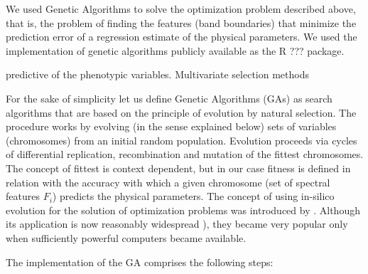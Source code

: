 {We used Genetic Algorithms to solve the optimization problem described
above, that is, the problem of finding the features (band boundaries)
that minimize the prediction error of a regression estimate of the
physical parameters. We used the implementation of genetic algorithms
publicly available as the R \citep{R2013} ???  package.

predictive of the phenotypic variables. Multivariate selection methods

For the sake of simplicity let us define Genetic Algorithms (GAs) as
search algorithms that are based on the principle of evolution by
natural selection. The procedure works by evolving (in the sense
explained below) sets of variables (chromosomes) from an initial
random population. Evolution proceeds via cycles of differential
replication, recombination and mutation of the fittest
chromosomes. The concept of fittest is context dependent, but in our
case fitness is defined in relation with the accuracy with which a
given chromosome (set of spectral features ${F_i}$) predicts the
physical parameters. The concept of using in-silico evolution for the
solution of optimization problems was introduced
by \cite{holland1975adaptation}. Although its application is now
reasonably widespread \citep[see e.g. ]{goldberg1989genetic}), they
became very popular only when sufficiently powerful computers became
available.


The implementation of the GA comprises the following steps:

}
